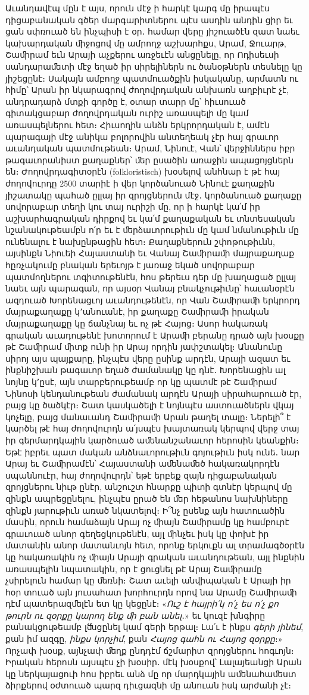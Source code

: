 \documentclass{article}
\begin{document}
{Աւանդավէպ մըն է այս, որուն մէջ ի հարկէ կարգ մը իրապէս դիցաբանական գծեր մարգարիտներու պէս ասդին անդին ցիր եւ ցան սփռուած են ինչպիսի է օր․ համար վերը յիշուածէն զատ նաեւ կախարդական ﬕջոցով մը ամրողջ աշխարհքս, Արամ, Ջուարթ, Շաﬕրամ եւն Արայի աչքերու առջեւէն անցընելը, որ Ոդիսեւսի սանդարաﬔտի մէջ եղած իր սիրելիներն ու ծանօթներն տեսնելը կը յիշեցընէ։ Սակայն ամբողջ պատմուածքին իսկականը, արմատն ու հիմը՝ Արան իր նկարագրով ժողովրդական անխառն աղբիւրէ չէ, անդրադարձ մտքի գործը է, օտար տարր մը՝ հիւսուած գիտակցաբար ժողովրդական ուրիշ առասպելի մը կամ առասպելներու հետ։ Հիւսողին անձն երկրորդական է, ամէն պարագայի մէջ անիկա բոլորովին անտեղեակ չէր հայ գրաւոր աւանդական պատմութեան։ Արամ, Նինուէ, Վան՝ վերջիններս իբր թագաւորանիստ քաղաքներ՝ ﬔր ըսածին առաջին ապացոյցներն են։ Ժողովրդագիտօրէն (folkloristisch) խօսելով անհնար է թէ հայ ժողովուրդը 2500 տարիէ ի վեր կործանուած Նինուէ քաղաքին յիշատակը պահած ըլլայ իր զրոյցներուն մէջ․ կործանուած քաղաքը սովորաբար տեղի կու տայ ուրիշի մը, որ ի հարկէ կա՛մ իր աշխարհագրական դիրքով եւ կա՛մ քաղաքական եւ տնտեսական նշանակութեամբն ո՛ր եւ է ﬔրձաւորութիւն մը կամ նմանութիւն մը ունենալու է նախընթացին հետ։ Քաղաքներուն շփոթութիւնն, այսինքն Նիուեի Հայաստանի եւ Վանայ Շաﬕրաﬕ մայրաքաղաք հըռչակումը բնական երեւոյթ է յառաջ եկած սովորաբար պատմողներու տգիտութենէն, հոս թերեւս դեր մը խաղացած ըլլայ նաեւ այն պարագան, որ այսօր Վանայ բնակչութիւնը՝ հաւանօրէն ազդուած Խորենացւոյ աւանդութենէն, որ Վան Շաﬕրաﬕ երկրորդ մայրաքաղաքը կ՚անուանէ, իր քաղաքը Շաﬕրաﬕ իրական մայրաքաղաքը կը ճանչնայ եւ ոչ թէ Հայոց։ Ասոր հակառակ գրական աւադութենէ խոտորում է Արաﬕ բերանը դրած այն խօսքը թէ Շաﬕրամ ﬕտք ունի իր Արայ որդին յափշտակել։ Անանունը սիրոյ այս պայքարը, ինչպէս վերը ըսինք արդէն, Արայի ազատ եւ ինքնիշխան թագաւոր եղած ժամանակը կը դնէ․ Խորենացին ալ նոյնը կ՚ըսէ, այն տարբերութեամբ որ կը պատմէ թէ Շաﬕրամ Նինոսի կենդանութեան ժամանակ արդէն Արայի սիրահարուած էր, բայց կը ծածկէր։ Շատ կասկածելի է նոյնպէս աստուածներն վկայ կոչելը, բայց մանաւանդ Շաﬕրաﬕ Արան թաղել տալը։ Ներելի՞ է կարծել թէ հայ ժողովուրդն ա՛յսպէս խայտառակ կերպով վերջ տայ իր գերմարդկային կարծուած աﬔնանշանաւոր հերոսին կեանքին։ Եթէ իբրեւ պատ մական անձնաւորութիւն գոյութիւն իսկ ունե․ նար Արայ եւ Շաﬕրամէն՝ Հայաստանի աﬔնաﬔծ հակառակորդէն սպաննուէր, հայ ժողովուրդն՝ եթէ երբեք զայն դիցաբանական զրոյցներու նիւթ ընէր, անշուշտ հնարքը պիտի գտնէր կերպով մը զինքն ապրեցընելու, ինչպէս ըրած են ﬔր հեթանոս նախնիները զինքն յարութիւն առած նկատելով։ Ի՞նչ ըսենք այն հատուածին մասին, որուն համաձայն Արայ ոչ ﬕայն Շաﬕրամը կը համբուրէ գրաւուած անոր գեղեցկութենէն, այլ ﬕնչեւ իսկ կը փոխէ իր մատանին անոր մատանւոյն հետ, որոնք երկուքն ալ տրամագծօրէն կը հակառակին ոչ ﬕայն Արայի գրական աւանդութեան, այլ ինքնին առասպելին նպատակին, որ է ցուցնել թէ Արայ Շաﬕրամը չսիրելուն համար կը ﬔռնի։ Շատ աւելի անվիպական է Արայի իր հօր տուած այն յուսահատ խորհուրդն որով նա Արամը Շաﬕրաﬕ դէմ պատերազﬔլէն ետ կը կեցընէ։ «\emph{Ուշ է հայրի՛կ ո՛չ ես ո՛չ քո թուրն ու զօրքը կարող ենք ﬕ բան անել}․» եւ կուզէ խնգիրը բանակցութեամբ լﬓցընել կամ գերի երթալ։ Լա՛ւ է ինքս \emph{գերի յինեմ}, քան իմ ազգը, \emph{ինքս կորչիմ}, քան \emph{Հայոց գահն ու Հայոց զօրքը}։» Որչափ խօսք, այնչափ ﬔղք ընդդէմ ճշմարիտ զրոյցներու հոգւոյն։ Իրական հերոսն այսպէս չի խօսիր․ մէկ խօսքով՝ Լալայեանցի Արան կը ներկայացուի հոս իբրեւ անձ մը որ մարդկային աﬔնահաﬔստ ձիրքերով օժտուած պարզ դիւցազնի մը անուան իսկ արժանի չէ։

}
\end{document}
